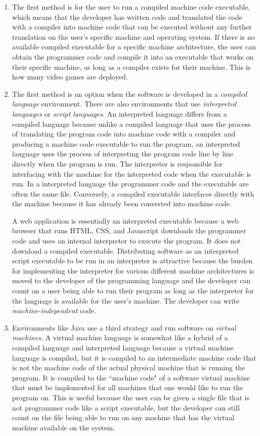\begin{enumerate}
\item The first method is for the user to run a compiled machine code executable, which means that the developer has written code and translated the code with a compiler into machine code that can be executed without any further translation on the user's specific machine and operating system. If there is no available compiled executable for a specific machine architecture, the user can obtain the programmer code and compile it into an executable that works on their specific machine, as long as a compiler exists for their machine. This is how many video games are deployed.

\item The first method is an option when the software is developed in a \emph{compiled language} environment. There are also environments that use \emph{interpreted languages} or \emph{script languages}. An interpreted language differs from a compiled language because unlike a compiled language that uses the process of translating the program code into machine code with a compiler and producing a machine code executable to run the program, an interpreted language uses the process of interpreting the program code line by line directly when the program is run. The interpreter is responsible for interfacing with the machine for the interpreted code when the executable is run. In a interpreted language the programmer code and the executable are often the same file. Conversely, a compiled executable interfaces directly with the machine because it has already been converted into machine code. 

A web application is essentially an interpreted executable because a web browser that runs HTML, CSS, and Javascript downloads the programmer code and uses an internal interpreter to execute the program. It does not download a compiled executable. Distributing software as an interpreted script executable to be run in an interpreter is attractive because the burden for implementing the interpreter for various different machine architectures is moved to the developer of the programming language and the developer can count on a user being able to run their program as long as the interpreter for the language is available for the user's machine. The developer can write \emph{machine-independent} code.

\item Environments like Java use a third strategy and run software on \emph{virtual machines}. A virtual machine language is somewhat like a hybrid of a compiled language and interpreted language because a virtual machine language is compiled, but it is compiled to an intermediate machine code that is not the machine code of the actual physical machine that is running the program. It is compiled to the ``machine code" of a software virtual machine that must be implemented for all machines that one would like to run the program on. This is useful because the user can be given a single file that is not programmer code like a script executable, but the developer can still count on the file being able to run on any machine that has the virtual machine available on the system.
\end{enumerate}


